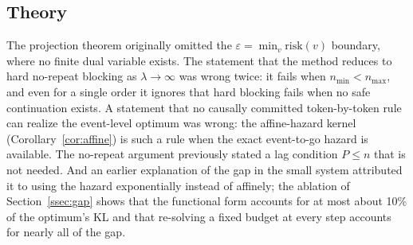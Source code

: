 \documentclass[11pt]{article}
\newcommand{\risk}{\mathrm{risk}}
\begin{document}
\subsection*{Theory}
The projection theorem originally omitted the $\varepsilon=\min_v\risk(v)$ boundary, where no finite dual variable exists. The statement that the method reduces to hard no-repeat blocking as $\lambda\to\infty$ was wrong twice: it fails when $n_{\min}<n_{\max}$, and even for a single order it ignores that hard blocking fails when no safe continuation exists. A statement that no causally committed token-by-token rule can realize the event-level optimum was wrong: the affine-hazard kernel (Corollary~\ref{cor:affine}) is such a rule when the exact event-to-go hazard is available. The no-repeat argument previously stated a lag condition $P\le n$ that is not needed. And an earlier explanation of the gap in the small system attributed it to using the hazard exponentially instead of affinely; the ablation of Section~\ref{ssec:gap} shows that the functional form accounts for at most about 10\% of the optimum's KL and that re-solving a fixed budget at every step accounts for nearly all of the gap.
\end{document}
